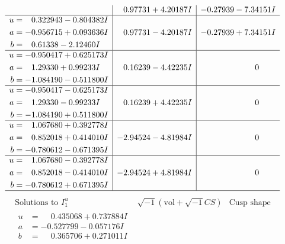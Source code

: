 \documentclass[1p]{elsarticle_modified}
\theoremstyle{definition}
\newcommand{\I}{\sqrt{-1}}
\begin{document}
$$\begin{array}{c|c|c}
 & \phantom{-}0.97731 + 4.20187 I & -0.27939 - 7.34151 I \\ \hline\begin{aligned}
u &= \phantom{-}0.322943 - 0.804382 I \\
a &= -0.956715 + 0.093636 I \\
b &= \phantom{-}0.61338 - 2.12460 I\end{aligned}
 & \phantom{-}0.97731 - 4.20187 I & -0.27939 + 7.34151 I \\ \hline\begin{aligned}
u &= -0.950417 + 0.625173 I \\
a &= \phantom{-}1.29330 + 0.99233 I \\
b &= -1.084190 - 0.511800 I\end{aligned}
 & \phantom{-}0.16239 - 4.42235 I & \phantom{-0.000000 } 0 \\ \hline\begin{aligned}
u &= -0.950417 - 0.625173 I \\
a &= \phantom{-}1.29330 - 0.99233 I \\
b &= -1.084190 + 0.511800 I\end{aligned}
 & \phantom{-}0.16239 + 4.42235 I & \phantom{-0.000000 } 0 \\ \hline\begin{aligned}
u &= \phantom{-}1.067680 + 0.392778 I \\
a &= \phantom{-}0.852018 + 0.414010 I \\
b &= -0.780612 - 0.671395 I\end{aligned}
 & -2.94524 - 4.81984 I & \phantom{-0.000000 } 0 \\ \hline\begin{aligned}
u &= \phantom{-}1.067680 - 0.392778 I \\
a &= \phantom{-}0.852018 - 0.414010 I \\
b &= -0.780612 + 0.671395 I\end{aligned}
 & -2.94524 + 4.81984 I & \phantom{-0.000000 } 0\\
 \hline 
 \end{array}$$\newpage$$\begin{array}{c|c|c}  
\text{Solutions to }I^u_{1}& \I (\text{vol} + \sqrt{-1}CS) & \text{Cusp shape}\\
 \hline 
\begin{aligned}
u &= \phantom{-}0.435068 + 0.737884 I \\
a &= -0.527799 - 0.057176 I \\
b &= \phantom{-}0.365706 + 0.271011 I\end{aligned}

\end{array}$$
\end{document}
